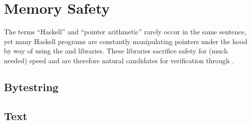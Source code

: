 \section{Memory Safety}\label{sec:memory-safety}

The terms ``Haskell'' and ``pointer arithmetic'' rarely occur in the same
sentence, yet many Haskell programs are constantly manipulating pointers under
the hood by way of using the \bytestring and \libtext libraries. These libraries
sacrifice safety for (much needed) speed and are therefore natural candidates for
verification through \toolname.

\subsection{Bytestring}\label{sec:bytestring}


\subsection{Text}\label{sec:text}




